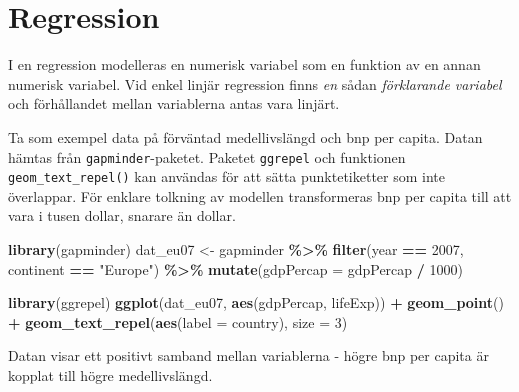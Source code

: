 \documentclass[
]{book}
\newenvironment{Shaded}{\begin{snugshade}}{\end{snugshade}}
\newcommand{\AttributeTok}[1]{\textcolor[rgb]{0.13,0.29,0.53}{#1}}
\newcommand{\DecValTok}[1]{\textcolor[rgb]{0.00,0.00,0.81}{#1}}
\newcommand{\FunctionTok}[1]{\textcolor[rgb]{0.13,0.29,0.53}{\textbf{#1}}}
\newcommand{\NormalTok}[1]{#1}
\newcommand{\OtherTok}[1]{\textcolor[rgb]{0.56,0.35,0.01}{#1}}
\newcommand{\SpecialCharTok}[1]{\textcolor[rgb]{0.81,0.36,0.00}{\textbf{#1}}}
\newcommand{\StringTok}[1]{\textcolor[rgb]{0.31,0.60,0.02}{#1}}
\theoremstyle{definition}
\theoremstyle{definition}
\theoremstyle{definition}
\theoremstyle{definition}
\theoremstyle{remark}
\begin{document}
\section{Regression}\label{regression}

I en regression modelleras en numerisk variabel som en funktion av en annan numerisk variabel. Vid enkel linjär regression finns \emph{en} sådan \emph{förklarande variabel} och förhållandet mellan variablerna antas vara linjärt.

Ta som exempel data på förväntad medellivslängd och bnp per capita. Datan hämtas från \texttt{gapminder}-paketet. Paketet \texttt{ggrepel} och funktionen \texttt{geom\_text\_repel()} kan användas för att sätta punktetiketter som inte överlappar. För enklare tolkning av modellen transformeras bnp per capita till att vara i tusen dollar, snarare än dollar.

\begin{Shaded}
\begin{Highlighting}[]
\FunctionTok{library}\NormalTok{(gapminder)}
\NormalTok{dat\_eu07 }\OtherTok{\textless{}{-}}\NormalTok{ gapminder }\SpecialCharTok{\%\textgreater{}\%} 
  \FunctionTok{filter}\NormalTok{(year }\SpecialCharTok{==} \DecValTok{2007}\NormalTok{, continent }\SpecialCharTok{==} \StringTok{"Europe"}\NormalTok{) }\SpecialCharTok{\%\textgreater{}\%} 
  \FunctionTok{mutate}\NormalTok{(}\AttributeTok{gdpPercap =}\NormalTok{ gdpPercap }\SpecialCharTok{/} \DecValTok{1000}\NormalTok{)}

\FunctionTok{library}\NormalTok{(ggrepel)}
\FunctionTok{ggplot}\NormalTok{(dat\_eu07, }\FunctionTok{aes}\NormalTok{(gdpPercap, lifeExp)) }\SpecialCharTok{+}
  \FunctionTok{geom\_point}\NormalTok{() }\SpecialCharTok{+}
  \FunctionTok{geom\_text\_repel}\NormalTok{(}\FunctionTok{aes}\NormalTok{(}\AttributeTok{label =}\NormalTok{ country), }\AttributeTok{size =} \DecValTok{3}\NormalTok{)}
\end{Highlighting}
\end{Shaded}

Datan visar ett positivt samband mellan variablerna - högre bnp per capita är kopplat till högre medellivslängd.
\end{document}
